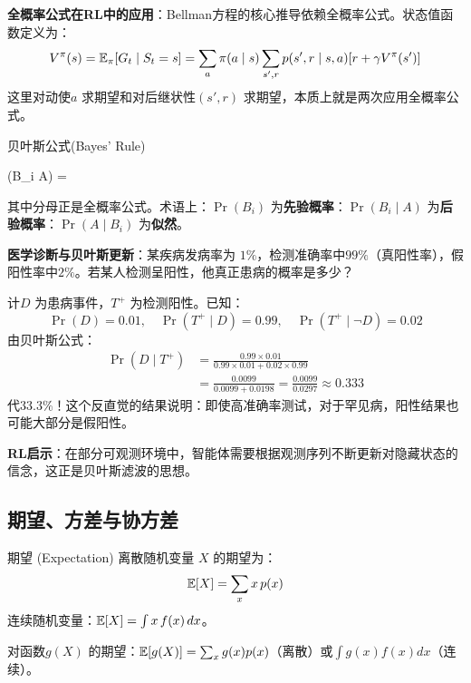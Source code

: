 \textbf{全概率公式在RL中的应用}：Bellman方程的核心推导依赖全概率公式。状态值函数定义为：
\[
V^{\pi}(s) = \mathbb{E}_\pi[G_t \mid S_t = s] = \sum_a \pi(a \mid s) \sum_{s', r} p(s', r \mid s, a) [r + \gamma V^{\pi}(s')]
\]
这里对动使$a$ 求期望和对后继状性$(s', r)$ 求期望，本质上就是两次应用全概率公式。

\begin{myTheorem}{贝叶斯公式(Bayes' Rule)}
\begin{myformula}
\Pr(B_i \mid A) = 
\end{myformula}
其中分母正是全概率公式。术语上：$\Pr(B_i)$ 为\textbf{先验概率}：$\Pr(B_i \mid A)$ 为\textbf{后验概率}：$\Pr(A \mid B_i)$ 为\textbf{似然}。
\end{myTheorem}

\begin{example}
\textbf{医学诊断与贝叶斯更新}：某疾病发病率为 $1\%$，检测准确率中$99\%$（真阳性率），假阳性率中$2\%$。若某人检测呈阳性，他真正患病的概率是多少？

计$D$ 为患病事件，$T^+$ 为检测阳性。已知：
\[
\Pr(D) = 0.01,\quad \Pr(T^+ \mid D) = 0.99,\quad \Pr(T^+ \mid \neg D) = 0.02
\]
由贝叶斯公式：
\begin{align*}
\Pr(D \mid T^+) &= \frac{0.99 \times 0.01}{0.99 \times 0.01 + 0.02 \times 0.99} \\
&= \frac{0.0099}{0.0099 + 0.0198} = \frac{0.0099}{0.0297} \approx 0.333
\end{align*}
代$33.3\%$！这个反直觉的结果说明：即使高准确率测试，对于罕见病，阳性结果也可能大部分是假阳性。

\textbf{RL启示}：在部分可观测环境中，智能体需要根据观测序列不断更新对隐藏状态的信念，这正是贝叶斯滤波的思想。
\end{example}

\subsection{期望、方差与协方差}

\begin{mydefinition}{期望 (Expectation)}
离散随机变量 $X$ 的期望为：
\[
\mathbb{E}[X] = \sum_{x} x \, p(x)
\]
连续随机变量：$\mathbb{E}[X] = \int x \, f(x) \, dx$。

对函数$g(X)$ 的期望：$\mathbb{E}[g(X)] = \sum_x g(x) p(x)$（离散）或$\int g(x) f(x) dx$（连续）。
\end{mydefinition}

